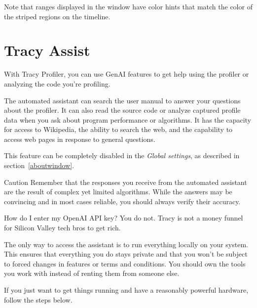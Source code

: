 \documentclass[hidelinks,titlepage,a4paper,twoside]{article}
\begin{document}
Note that ranges displayed in the window have color hints that match the color of the striped regions on the timeline.

\section{Tracy Assist}
\label{tracyassist}

With Tracy Profiler, you can use GenAI features to get help using the profiler or analyzing the code you're profiling.

The automated assistant can search the user manual to answer your questions about the profiler. It can also read the source code or analyze captured profile data when you ask about program performance or algorithms. It has the capacity for access to Wikipedia, the ability to search the web, and the capability to access web pages in response to general questions.

This feature can be completely disabled in the \emph{Global settings}, as described in section~\ref{aboutwindow}.

\begin{bclogo}[
noborder=true,
couleur=black!5,
logo=\bcattention
]{Caution}
Remember that the responses you receive from the automated assistant are the result of complex yet limited algorithms. While the answers may be convincing and in most cases reliable, you should always verify their accuracy.
\end{bclogo}

\begin{bclogo}[
noborder=true,
couleur=black!5,
logo=\bcquestion
]{How do I enter my OpenAI API key?}
You do not. Tracy is not a money funnel for Silicon Valley tech bros to get rich.

The only way to access the assistant is to run everything locally on your system. This ensures that everything you do stays private and that you won't be subject to forced changes in features or terms and conditions. You should own the tools you work with instead of renting them from someone else.
\end{bclogo}

If you just want to get things running and have a reasonably powerful hardware, follow the steps below.
\end{document}
